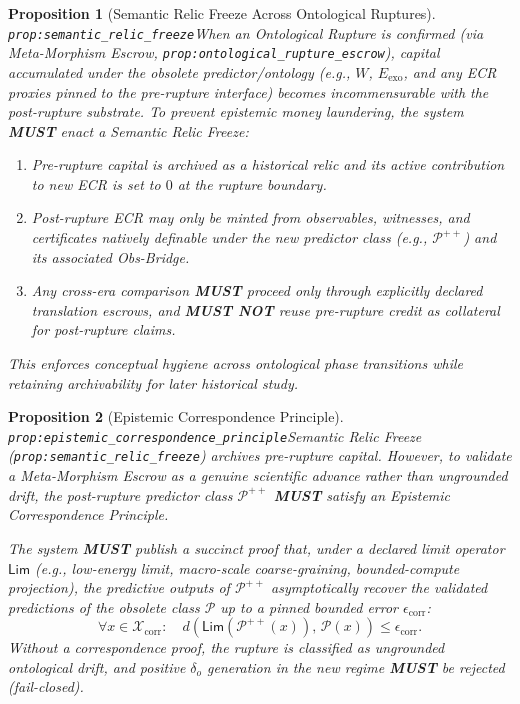 \documentclass[11pt]{article}
\theoremstyle{definition}
\theoremstyle{plain}
\newtheorem{proposition}{Proposition}
\newcommand{\MUST}{\textbf{MUST}}
\newcommand{\MUSTNOT}{\textbf{MUST NOT}}
\newcommand{\lbl}[1]{\texttt{\footnotesize\nolinkurl{#1}}}
\newcommand{\DefLabel}[1]{\hfill{\small\lbl{#1}}}
\begin{document}
\begin{proposition}[Semantic Relic Freeze Across Ontological Ruptures]\DefLabel{prop:semantic_relic_freeze}\label{prop:semantic_relic_freeze}
When an Ontological Rupture is confirmed (via Meta-Morphism Escrow, \lbl{prop:ontological_rupture_escrow}), capital accumulated under the obsolete predictor/ontology (e.g., $W$, $E_{\mathrm{exo}}$, and any ECR proxies pinned to the pre-rupture interface) becomes \emph{incommensurable} with the post-rupture substrate.
To prevent epistemic money laundering, the system \MUST{} enact a \emph{Semantic Relic Freeze}:
\begin{enumerate}
\item Pre-rupture capital is archived as a historical relic and its \emph{active} contribution to new ECR is set to $0$ at the rupture boundary.
\item Post-rupture ECR may only be minted from observables, witnesses, and certificates natively definable under the new predictor class (e.g., $\mathcal{P}^{++}$) and its associated Obs-Bridge.
\item Any cross-era comparison \MUST{} proceed only through explicitly declared translation escrows, and \MUSTNOT{} reuse pre-rupture credit as collateral for post-rupture claims.
\end{enumerate}
This enforces conceptual hygiene across ontological phase transitions while retaining archivability for later historical study.
\end{proposition}

\begin{proposition}[Epistemic Correspondence Principle]\DefLabel{prop:epistemic_correspondence_principle}\label{prop:epistemic_correspondence_principle}
Semantic Relic Freeze (\lbl{prop:semantic_relic_freeze}) archives pre-rupture capital. However, to validate a Meta-Morphism Escrow as a genuine scientific advance rather than ungrounded drift, the post-rupture predictor class $\mathcal{P}^{++}$ \MUST{} satisfy an \emph{Epistemic Correspondence Principle}.

The system \MUST{} publish a succinct proof that, under a declared limit operator $\mathsf{Lim}$ (e.g., low-energy limit, macro-scale coarse-graining, bounded-compute projection), the predictive outputs of $\mathcal{P}^{++}$ asymptotically recover the validated predictions of the obsolete class $\mathcal{P}$ up to a pinned bounded error $\epsilon_{\mathrm{corr}}$:
\[
\forall x \in \mathcal{X}_{\mathrm{corr}}:\quad d\!\left(\mathsf{Lim}(\mathcal{P}^{++}(x)),\, \mathcal{P}(x)\right) \le \epsilon_{\mathrm{corr}}.
\]
Without a correspondence proof, the rupture is classified as \emph{ungrounded ontological drift}, and positive $\delta_o$ generation in the new regime \MUST{} be rejected (fail-closed).
\end{proposition}
\end{document}
